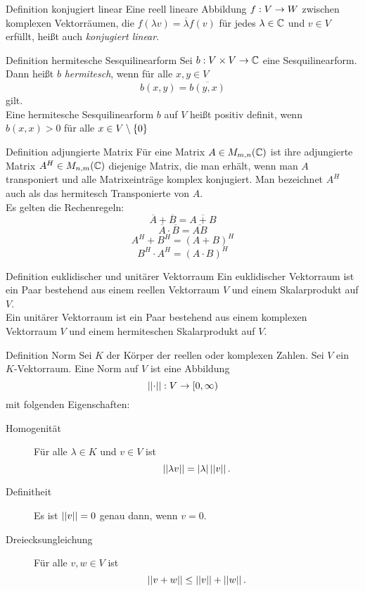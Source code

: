\documentclass[main.tex]{subfiles}
\begin{document}
\begin{karte}{Definition konjugiert linear}
    Eine reell lineare Abbildung \(f : V \rightarrow W\) zwischen komplexen Vektorräumen,
    die \(f(\lambda v) = \overline{\lambda}f(v)\) für jedes \(\lambda \in \mathbb{C}\)
    und \(v \in V\) erfüllt, heißt auch \textit{konjugiert linear}.
\end{karte}

\begin{karte}{Definition hermitesche Sesquilinearform}
    Sei \(b : V\times V \rightarrow \mathbb{C}\) eine Sesquilinearform. 
    Dann heißt \(b\) \textit{hermitesch},
    wenn für alle \(x,y \in V\)
    \[ b(x,y) = \overline{b(y,x)} \]
    gilt.\\
    Eine hermitesche Sesquilinearform \(b\) auf \(V\) heißt positiv definit,
    wenn \(b(x,x) > 0\) für alle \(x \in V \setminus \{0\}\)
\end{karte}

\begin{karte}{Definition adjungierte Matrix}
    Für eine Matrix \(A \in M_{m,n}(\mathbb{C})\) ist ihre 
    adjungierte Matrix \(A^H \in M_{n,m}(\mathbb{C})\)
    diejenige Matrix, die man erhält, wenn man 
    \(A\) transponiert und alle Matrixeinträge 
    komplex konjugiert. Man bezeichnet \(A^H\) 
    auch als das hermitesch Transponierte von \(A\).\\
    Es gelten die Rechenregeln:\\
    \[ \overline{A} + \overline{B} = \overline{A + B} \]
    \[ \overline{A} \cdot \overline{B} = \overline{AB} \]
    \[ A^H + B^H = (A + B)^H \]
    \[ B^H \cdot A^H = (A \cdot B)^H \]
\end{karte}

\begin{karte}{Definition euklidischer und unitärer Vektorraum}
    Ein euklidischer Vektorraum ist ein Paar bestehend aus einem reellen Vektorraum \(V\)
    und einem Skalarprodukt auf \(V\).\\
    Ein unitärer Vektorraum ist ein Paar bestehend aus einem komplexen Vektorraum \(V\) und
    einem hermiteschen Skalarprodukt auf \(V\).
\end{karte}

\begin{karte}{Definition Norm}
    Sei \(K\) der Körper der reellen oder komplexen Zahlen. Sei \(V\) ein \(K\)-Vektorraum.
    Eine Norm auf \(V\) ist eine Abbildung
    \[ \left|\left|\cdot\right|\right| : V \rightarrow [0, \infty) \]
    mit folgenden Eigenschaften:
    \begin{description}
        \item[Homogenität] Für alle \(\lambda \in K\) und \(v \in V\) ist 
        \[ \left|\left|\lambda v\right|\right| = \left| \lambda \right| \left|\left|v\right|\right|. \]
        \item[Definitheit] Es ist \(\left|\left|v\right|\right| = 0\) genau dann, wenn \(v = 0\).
        \item[Dreiecksungleichung] Für alle \(v, w \in V\) ist
        \[ \left|\left|v+w\right|\right| \leq \left|\left|v\right|\right| + \left|\left|w\right|\right|. \]   
    \end{description}
\end{karte}
\end{document}
